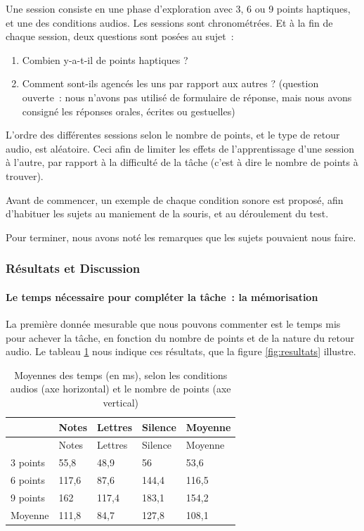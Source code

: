 \documentclass[
]{book}
\providecommand{\tightlist}{%
  \setlength{\itemsep}{0pt}\setlength{\parskip}{0pt}}
\begin{document}
Une session consiste en une phase d'exploration avec 3, 6 ou 9 points
haptiques, et une des conditions audios. Les sessions sont chronométrées. Et
à la fin de chaque session, deux questions sont posées au sujet~:

\begin{enumerate}
\def\labelenumi{\arabic{enumi}.}
\tightlist
\item
  Combien y-a-t-il de points haptiques ?
\item
  Comment sont-ils agencés les uns par rapport aux
  autres ? (question ouverte~: nous n'avons pas utilisé de formulaire de
  réponse, mais nous avons consigné les réponses orales, écrites ou
  gestuelles)
\end{enumerate}

L'ordre des différentes sessions selon le nombre de points, et le type de
retour audio, est aléatoire. Ceci afin de limiter les effets de
l'apprentissage d'une session à l'autre, par rapport à la difficulté de la
tâche (c'est à dire le nombre de points à trouver).

Avant de commencer, un exemple de chaque condition sonore est proposé,
afin d'habituer les sujets au maniement de la souris, et au déroulement du
test.

Pour terminer, nous avons noté les remarques que les sujets pouvaient nous
faire.

\hypertarget{ruxe9sultats-et-discussion}{%
\subsubsection{Résultats et Discussion}\label{ruxe9sultats-et-discussion}}

\hypertarget{le-temps-nuxe9cessaire-pour-compluxe9ter-la-tuxe2che-la-muxe9morisation}{%
\paragraph{Le temps nécessaire pour compléter la tâche~: la mémorisation}\label{le-temps-nuxe9cessaire-pour-compluxe9ter-la-tuxe2che-la-muxe9morisation}}

La première donnée mesurable que nous pouvons commenter est le temps mis
pour achever la tâche, en fonction du nombre de points et de la nature du
retour audio. Le tableau \ref{tab:moyennes} nous
indique ces résultats, que la figure \ref{fig:resultats} illustre.

\begin{longtable}[]{@{}lllll@{}}
\caption{\label{tab:moyennes} Moyennes des
temps (en ms), selon les conditions audios (axe horizontal) et le
nombre de points (axe vertical)}\tabularnewline
\toprule()
& Notes & Lettres & Silence & Moyenne \\
\midrule()
\endfirsthead
\toprule()
& Notes & Lettres & Silence & Moyenne \\
\midrule()
\endhead
3 points & 55,8 & 48,9 & 56 & 53,6 \\
6 points & 117,6 & 87,6 & 144,4 & 116,5 \\
9 points & 162 & 117,4 & 183,1 & 154,2 \\
Moyenne & 111,8 & 84,7 & 127,8 & 108,1 \\
\bottomrule()
\end{longtable}
\end{document}
